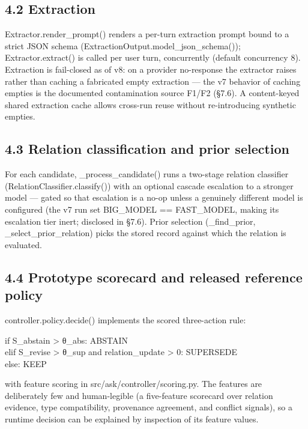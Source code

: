 \subsection{4.2 Extraction}\label{extraction}

Extractor.render\_prompt() renders a per-turn extraction prompt bound to
a strict JSON schema (ExtractionOutput.model\_json\_schema());
Extractor.extract() is called per user turn, concurrently (default
concurrency 8). Extraction is fail-closed as of v8: on a provider
no-response the extractor raises rather than caching a fabricated empty
extraction --- the v7 behavior of caching empties is the documented
contamination source F1/F2 (§7.6). A content-keyed shared extraction
cache allows cross-run reuse without re-introducing synthetic empties.

\subsection{4.3 Relation classification and prior
selection}\label{relation-classification-and-prior-selection}

For each candidate, \_process\_candidate() runs a two-stage relation
classifier (RelationClassifier.classify()) with an optional cascade
escalation to a stronger model --- gated so that escalation is a no-op
unless a genuinely different model is configured (the v7 run set
BIG\_MODEL == FAST\_MODEL, making its escalation tier inert; disclosed
in §7.6). Prior selection (\_find\_prior, \_select\_prior\_relation)
picks the stored record against which the relation is evaluated.

\subsection{4.4 Prototype scorecard and released reference
policy}\label{prototype-scorecard-and-released-reference-policy}

controller.policy.decide() implements the scored three-action rule:

if S\_abstain \textgreater{} θ\_abs: ABSTAIN\\
elif S\_revise \textgreater{} θ\_sup and relation\_update \textgreater{}
0: SUPERSEDE\\
else: KEEP

with feature scoring in src/ask/controller/scoring.py. The features are
deliberately few and human-legible (a five-feature scorecard over
relation evidence, type compatibility, provenance agreement, and
conflict signals), so a runtime decision can be explained by inspection
of its feature values.

